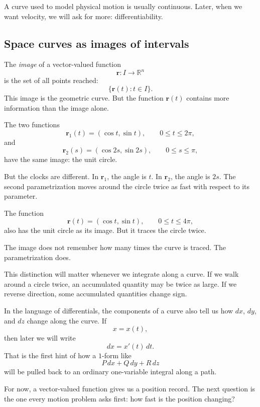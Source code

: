 A curve used to model physical motion is usually continuous.  Later, when we want
velocity, we will ask for more: differentiability.

\subsection{Space curves as images of intervals}

The \emph{image} of a vector-valued function
\[
    \mathbf r:I\to\mathbb R^n
\]
is the set of all points reached:
\[
    \{\mathbf r(t):t\in I\}.
\]
This image is the geometric curve.  But the function \(\mathbf r(t)\) contains more
information than the image alone.

\begin{example}
The two functions
\[
    \mathbf r_1(t)=(\cos t,\sin t),
    \qquad 0\le t\le2\pi,
\]
and
\[
    \mathbf r_2(s)=(\cos 2s,\sin 2s),
    \qquad 0\le s\le\pi,
\]
have the same image: the unit circle.

But the clocks are different.  In \(\mathbf r_1\), the angle is \(t\).  In \(\mathbf r_2\),
the angle is \(2s\).  The second parametrization moves around the circle twice as fast
with respect to its parameter.
\end{example}

\begin{example}
The function
\[
    \mathbf r(t)=(\cos t,\sin t),
    \qquad 0\le t\le4\pi,
\]
also has the unit circle as its image.  But it traces the circle twice.

The image does not remember how many times the curve is traced.  The parametrization
does.
\end{example}

This distinction will matter whenever we integrate along a curve.  If we walk around a
circle twice, an accumulated quantity may be twice as large.  If we reverse direction,
some accumulated quantities change sign.

In the language of differentials, the components of a curve also tell us how \(dx\),
\(dy\), and \(dz\) change along the curve.  If
\[
    x=x(t),
\]
then later we will write
\[
    dx=x'(t)\,dt.
\]
That is the first hint of how a \(1\)-form like
\[
    P\,dx+Q\,dy+R\,dz
\]
will be pulled back to an ordinary one-variable integral along a path.

For now, a vector-valued function gives us a position record.  The next question is the
one every motion problem asks first: how fast is the position changing?

